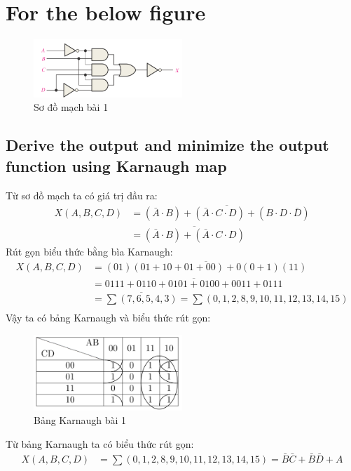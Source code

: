 \section{For the below figure}
    \begin{figure}[H]
        \centering
        \includegraphics[width=0.5\textwidth]{pictures/1_diagram.png}
        \caption{Sơ đồ mạch bài 1}
        \label{fig:1_diagram}
    \end{figure}
    \subsection{Derive the output and minimize the output function using Karnaugh map}
        \hspace*{0.6cm}Từ sơ đồ mạch ta có giá trị đầu ra:
        \begin{align*}
            X(A, B, C, D) &= \overline{(\bar{A} \cdot B) + (\bar{A} \cdot C \cdot D) + (B \cdot D \cdot \bar{D})} \\
            &= \overline{(\bar{A} \cdot B) + (\bar{A} \cdot C \cdot D)}  
        \end{align*}
        \hspace*{0.6cm}Rút gọn biểu thức bằng bìa Karnaugh:
        \begin{align*}
            X(A, B, C, D) &= \overline{(01)(01 + 10 + 01 + 00) + 0(0 + 1) (11)} \\
            &= \overline{0111 + 0110 + 0101 + 0100 + 0011 + 0111} \\
            &= \overline{\sum{(7,6,5,4,3)}} = \sum{(0,1,2,8,9,10,11,12,13,14,15)} \\
        \end{align*}
        \hspace*{0.6cm}Vậy ta có bảng Karnaugh và biểu thức rút gọn:
        \begin{figure}[H]
            \centering
            \includegraphics[width=0.5\textwidth]{pictures/1_karnaugh.png}
            \caption{Bảng Karnaugh bài 1}
        \end{figure}
        Từ bảng Karnaugh ta có biểu thức rút gọn:
        \begin{align*}
            X(A, B, C, D) &= \sum{(0,1,2,8,9,10,11,12,13,14,15)} = \bar{B}\bar{C} + \bar{B}\bar{D} + A\\
        \end{align*}
